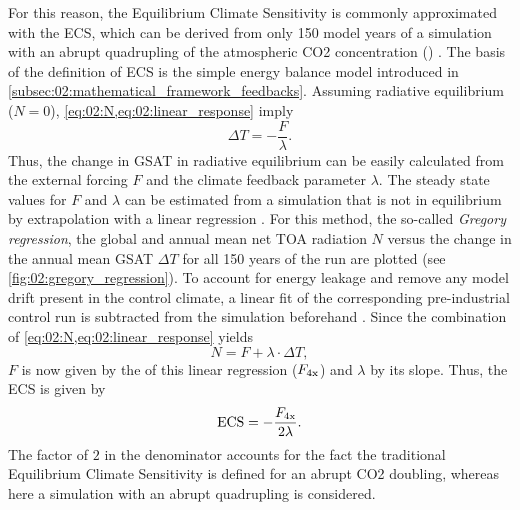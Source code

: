For this reason, the Equilibrium Climate Sensitivity is commonly approximated
with the \acf{ECS}, which can be derived from only 150 model years of a
simulation with an abrupt quadrupling of the atmospheric \ac{CO2} concentration
() \autocite{Gregory2004}. The basis of the definition of \ac{ECS}
is the simple energy balance model introduced in
\cref{subsec:02:mathematical_framework_feedbacks}. Assuming radiative
equilibrium ($N = 0$), \cref{eq:02:N,eq:02:linear_response} imply
\begin{equation}
  \Delta T = -\frac{F}{\lambda}.
  \label{eq:02:delta_t_eq}
\end{equation}
Thus, the change in \ac{GSAT} in radiative equilibrium can be easily calculated
from the external forcing $F$ and the climate feedback parameter $\lambda$. The
steady state values for $F$ and $\lambda$ can be estimated from a 
simulation that is not in equilibrium by extrapolation with a linear regression
\autocite{Gregory2004}. For this method, the so-called \emph{Gregory
  regression}, the global and annual mean net \ac{TOA} radiation $N$ versus the
change in the annual mean \ac{GSAT} $\Delta T$ for all 150 years of the
 run are plotted (see \cref{fig:02:gregory_regression}). To account
for energy leakage and remove any model drift present in the control climate, a
linear fit of the corresponding pre-industrial control run is subtracted from
the  simulation beforehand \autocite{Andrews2012}. Since the
combination of \cref{eq:02:N,eq:02:linear_response} yields
\begin{equation}
  N = F + \lambda \cdot \Delta T,
  \label{eq:02:N_vs_delta_t}
\end{equation}
$F$ is now given by the \yintercept{} of this linear regression
($F_\textnormal{4x}$) and $\lambda$ by its slope. Thus, the \ac{ECS} is given by
\begin{equation}
  \textnormal{ECS} = -\frac{F_\textnormal{4x}}{2 \lambda}.
  \label{eq:02:ecs}
\end{equation}
The factor of $2$ in the denominator accounts for the fact the traditional
Equilibrium Climate Sensitivity is defined for an abrupt \ac{CO2} doubling,
whereas here a simulation with an abrupt quadrupling is considered.

